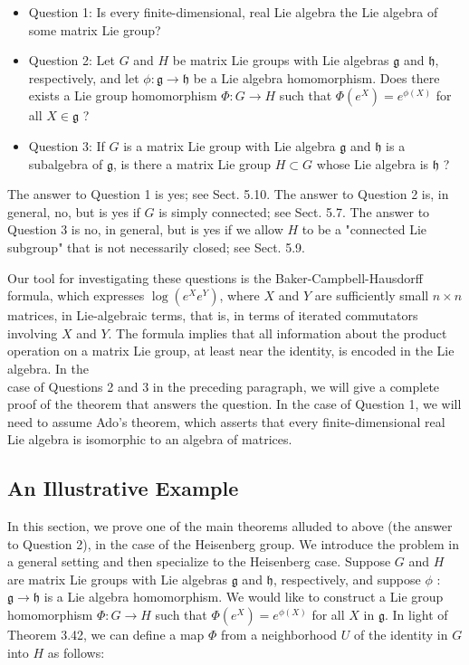 \documentclass[10pt, letterpaper]{article}
\begin{document}
\begin{itemize}
  \item Question 1: Is every finite-dimensional, real Lie algebra the Lie algebra of some matrix Lie group?
  \item Question 2: Let $G$ and $H$ be matrix Lie groups with Lie algebras $\mathfrak{g}$ and $\mathfrak{h}$, respectively, and let $\phi: \mathfrak{g} \rightarrow \mathfrak{h}$ be a Lie algebra homomorphism. Does there exists a Lie group homomorphism $\Phi: G \rightarrow H$ such that $\Phi\left(e^{X}\right)=e^{\phi(X)}$ for all $X \in \mathfrak{g}$ ?
  \item Question 3: If $G$ is a matrix Lie group with Lie algebra $\mathfrak{g}$ and $\mathfrak{h}$ is a subalgebra of $\mathfrak{g}$, is there a matrix Lie group $H \subset G$ whose Lie algebra is $\mathfrak{h}$ ?
\end{itemize}

The answer to Question 1 is yes; see Sect. 5.10. The answer to Question 2 is, in general, no, but is yes if $G$ is simply connected; see Sect. 5.7. The answer to Question 3 is no, in general, but is yes if we allow $H$ to be a "connected Lie subgroup" that is not necessarily closed; see Sect. 5.9.

Our tool for investigating these questions is the Baker-Campbell-Hausdorff formula, which expresses $\log \left(e^{X} e^{Y}\right)$, where $X$ and $Y$ are sufficiently small $n \times n$ matrices, in Lie-algebraic terms, that is, in terms of iterated commutators involving $X$ and $Y$. The formula implies that all information about the product operation on a matrix Lie group, at least near the identity, is encoded in the Lie algebra. In the\\
case of Questions 2 and 3 in the preceding paragraph, we will give a complete proof of the theorem that answers the question. In the case of Question 1, we will need to assume Ado's theorem, which asserts that every finite-dimensional real Lie algebra is isomorphic to an algebra of matrices.

\subsection*{An Illustrative Example}
In this section, we prove one of the main theorems alluded to above (the answer to Question 2), in the case of the Heisenberg group. We introduce the problem in a general setting and then specialize to the Heisenberg case. Suppose $G$ and $H$ are matrix Lie groups with Lie algebras $\mathfrak{g}$ and $\mathfrak{h}$, respectively, and suppose $\phi$ : $\mathfrak{g} \rightarrow \mathfrak{h}$ is a Lie algebra homomorphism. We would like to construct a Lie group homomorphism $\Phi: G \rightarrow H$ such that $\Phi\left(e^{X}\right)=e^{\phi(X)}$ for all $X$ in $\mathfrak{g}$. In light of Theorem 3.42, we can define a map $\Phi$ from a neighborhood $U$ of the identity in $G$ into $H$ as follows:
\end{document}

